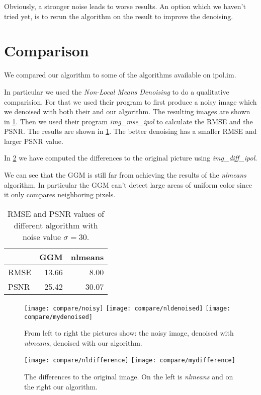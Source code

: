 \documentclass[12pt]{scrartcl}
\begin{document}
Obviously, a stronger noise leads to worse results. An option which we haven't tried yet, is to rerun the algorithm on the result to improve the denoising.


\clearpage
\section{Comparison}

We compared our algorithm to some of the algorithms available on ipol.im.

In particular we used the \emph{Non-Local Means Denoising} to do a qualitative comparision. For that we used their program to first produce a noisy image which we denoised with both their and our algorithm. The resulting images are shown in \cref{fig:den}. Then we used their program \emph{img\_mse\_ipol} to calculate the RMSE and the PSNR. The results are shown in \cref{tab:rmse}. The better denoising has a smaller RMSE and larger PSNR value.

In \cref{fig:diff} we have computed the differences to the original picture using \emph{img\_diff\_ipol}.

We can see that the GGM is still far from achieving the results of the \emph{nlmeans} algorithm. In particular the GGM can't detect large areas of uniform color since it only compares neighboring pixels.

\begin{table}
  \centering
  \caption{RMSE and PSNR values of different algorithm with noise value $\sigma=30$.}
  \begin{tabular}{l | r | r}
          & GGM   & nlmeans \\
    \hline
    RMSE  & 13.66 & 8.00    \\
    PSNR  & 25.42 & 30.07
  \end{tabular}
  \label{tab:rmse}
\end{table}

\begin{figure}[h]
  \centering
  \texttt{[image: compare/noisy]}
  \texttt{[image: compare/nldenoised]}
  \texttt{[image: compare/mydenoised]}
  \caption{From left to right the pictures show: the noisy image, denoised with \emph{nlmeans}, denoised with our algorithm.}
  \label{fig:den}
\end{figure}

\begin{figure}[h]
  \centering
  \texttt{[image: compare/nldifference]}
  \texttt{[image: compare/mydifference]}
  \caption{The differences to the original image. On the left is \emph{nlmeans} and on the right our algorithm.}
  \label{fig:diff}
\end{figure}



\clearpage

\end{document}
